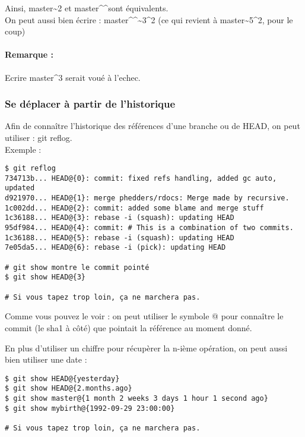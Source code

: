 Ainsi, master\textasciitilde2 et master\textasciicircum\textasciicircum sont équivalents.\\
On peut aussi bien écrire : master\textasciicircum\textasciicircum\textasciitilde3\textasciicircum2 (ce qui revient à master\textasciitilde5\textasciicircum2, pour le coup)\\

\paragraph{Remarque :} Ecrire master\textasciicircum3 serait voué à l'echec.

\newpage
\subsubsection{Se déplacer à partir de l'historique}

Afin de connaître l'historique des références d'une branche ou de HEAD, on peut utiliser : git reflog.\\

Exemple : 
\begin{verbatim}
$ git reflog
734713b... HEAD@{0}: commit: fixed refs handling, added gc auto, updated
d921970... HEAD@{1}: merge phedders/rdocs: Merge made by recursive.
1c002dd... HEAD@{2}: commit: added some blame and merge stuff
1c36188... HEAD@{3}: rebase -i (squash): updating HEAD
95df984... HEAD@{4}: commit: # This is a combination of two commits.
1c36188... HEAD@{5}: rebase -i (squash): updating HEAD
7e05da5... HEAD@{6}: rebase -i (pick): updating HEAD

# git show montre le commit pointé
$ git show HEAD@{3}

# Si vous tapez trop loin, ça ne marchera pas.
\end{verbatim}

Comme vous pouvez le voir : on peut utiliser le symbole @ pour connaître le commit (le sha1 à côté) que pointait la référence au moment donné.

En plus d'utiliser un chiffre pour récupèrer la n-ième opération, on peut aussi bien utiliser une date :

\begin{verbatim}
$ git show HEAD@{yesterday}
$ git show HEAD@{2.months.ago}
$ git show master@{1 month 2 weeks 3 days 1 hour 1 second ago}
$ git show mybirth@{1992-09-29 23:00:00}

# Si vous tapez trop loin, ça ne marchera pas.
\end{verbatim}

